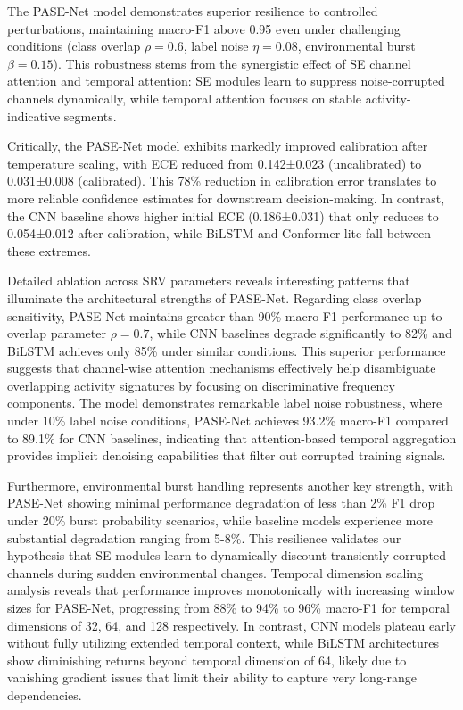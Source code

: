 \documentclass[journal]{IEEEtran}
\begin{document}
The PASE-Net model demonstrates superior resilience to controlled perturbations, maintaining macro-F1 above 0.95 even under challenging conditions (class overlap $\rho=0.6$, label noise $\eta=0.08$, environmental burst $\beta=0.15$). This robustness stems from the synergistic effect of SE channel attention and temporal attention: SE modules learn to suppress noise-corrupted channels dynamically, while temporal attention focuses on stable activity-indicative segments.

Critically, the PASE-Net model exhibits markedly improved calibration after temperature scaling, with ECE reduced from 0.142±0.023 (uncalibrated) to 0.031±0.008 (calibrated). This 78\% reduction in calibration error translates to more reliable confidence estimates for downstream decision-making. In contrast, the CNN baseline shows higher initial ECE (0.186±0.031) that only reduces to 0.054±0.012 after calibration, while BiLSTM and Conformer-lite fall between these extremes.

Detailed ablation across SRV parameters reveals interesting patterns that illuminate the architectural strengths of PASE-Net. Regarding class overlap sensitivity, PASE-Net maintains greater than 90\% macro-F1 performance up to overlap parameter $\rho=0.7$, while CNN baselines degrade significantly to 82\% and BiLSTM achieves only 85\% under similar conditions. This superior performance suggests that channel-wise attention mechanisms effectively help disambiguate overlapping activity signatures by focusing on discriminative frequency components. The model demonstrates remarkable label noise robustness, where under 10\% label noise conditions, PASE-Net achieves 93.2\% macro-F1 compared to 89.1\% for CNN baselines, indicating that attention-based temporal aggregation provides implicit denoising capabilities that filter out corrupted training signals.

Furthermore, environmental burst handling represents another key strength, with PASE-Net showing minimal performance degradation of less than 2\% F1 drop under 20\% burst probability scenarios, while baseline models experience more substantial degradation ranging from 5-8\%. This resilience validates our hypothesis that SE modules learn to dynamically discount transiently corrupted channels during sudden environmental changes. Temporal dimension scaling analysis reveals that performance improves monotonically with increasing window sizes for PASE-Net, progressing from 88\% to 94\% to 96\% macro-F1 for temporal dimensions of 32, 64, and 128 respectively. In contrast, CNN models plateau early without fully utilizing extended temporal context, while BiLSTM architectures show diminishing returns beyond temporal dimension of 64, likely due to vanishing gradient issues that limit their ability to capture very long-range dependencies.
\end{document}
